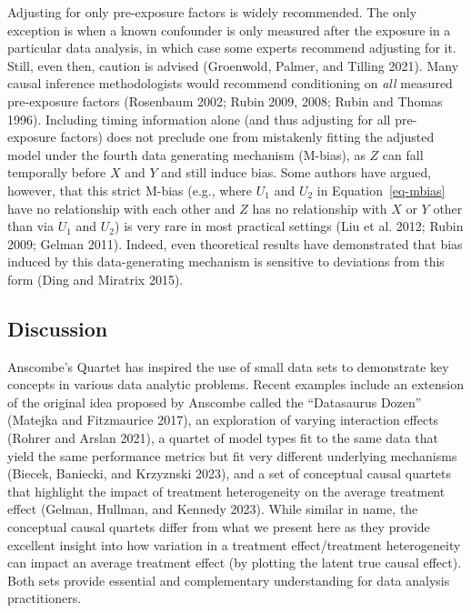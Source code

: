 \documentclass[
  letterpaper,
  DIV=11,
  numbers=noendperiod]{scrartcl}
\begin{document}
Adjusting for only pre-exposure factors is widely recommended. The only
exception is when a known confounder is only measured after the exposure
in a particular data analysis, in which case some experts recommend
adjusting for it. Still, even then, caution is advised (Groenwold,
Palmer, and Tilling 2021). Many causal inference methodologists would
recommend conditioning on \emph{all} measured pre-exposure factors
(Rosenbaum 2002; Rubin 2009, 2008; Rubin and Thomas 1996). Including
timing information alone (and thus adjusting for all pre-exposure
factors) does not preclude one from mistakenly fitting the adjusted
model under the fourth data generating mechanism (M-bias), as \(Z\) can
fall temporally before \(X\) and \(Y\) and still induce bias. Some
authors have argued, however, that this strict M-bias (e.g., where
\(U_1\) and \(U_2\) in Equation~\ref{eq-mbias} have no relationship with
each other and \(Z\) has no relationship with \(X\) or \(Y\) other than
via \(U_1\) and \(U_2\)) is very rare in most practical settings (Liu et
al. 2012; Rubin 2009; Gelman 2011). Indeed, even theoretical results
have demonstrated that bias induced by this data-generating mechanism is
sensitive to deviations from this form (Ding and Miratrix 2015).

\hypertarget{discussion}{%
\subsection{Discussion}\label{discussion}}

Anscombe's Quartet has inspired the use of small data sets to
demonstrate key concepts in various data analytic problems. Recent
examples include an extension of the original idea proposed by Anscombe
called the ``Datasaurus Dozen'' (Matejka and Fitzmaurice 2017), an
exploration of varying interaction effects (Rohrer and Arslan 2021), a
quartet of model types fit to the same data that yield the same
performance metrics but fit very different underlying mechanisms
(Biecek, Baniecki, and Krzyznski 2023), and a set of conceptual causal
quartets that highlight the impact of treatment heterogeneity on the
average treatment effect (Gelman, Hullman, and Kennedy 2023). While
similar in name, the conceptual causal quartets differ from what we
present here as they provide excellent insight into how variation in a
treatment effect/treatment heterogeneity can impact an average treatment
effect (by plotting the latent true causal effect). Both sets provide
essential and complementary understanding for data analysis
practitioners.
\end{document}
